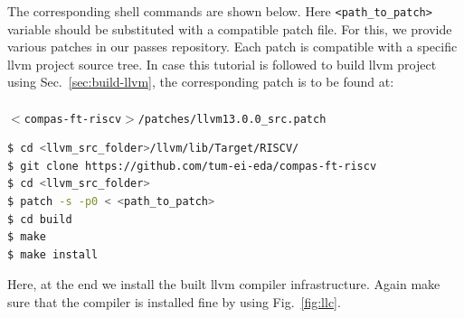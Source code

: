 The corresponding shell commands are shown below. Here \texttt{<path\_to\_patch>} variable should be substituted
with a compatible patch file. For this, we provide various patches in our passes repository.
Each patch is compatible with a specific llvm project source tree.
In case this tutorial is followed to build llvm project using Sec.~\ref{sec:build-llvm},
the corresponding patch is to be found at:\\\\
\texttt{$<$compas-ft-riscv$>$/patches/llvm13.0.0\_src.patch}

\begin{framed}
 \begin{lstlisting}[language=bash, basicstyle=\small\ttfamily]
$ cd <llvm_src_folder>/llvm/lib/Target/RISCV/
$ git clone https://github.com/tum-ei-eda/compas-ft-riscv
$ cd <llvm_src_folder>
$ patch -s -p0 < <path_to_patch>
$ cd build
$ make
$ make install
\end{lstlisting}
\end{framed}

Here, at the end we install the built llvm compiler infrastructure. Again make sure that the compiler is installed fine
by using Fig.~\ref{fig:llc}.
